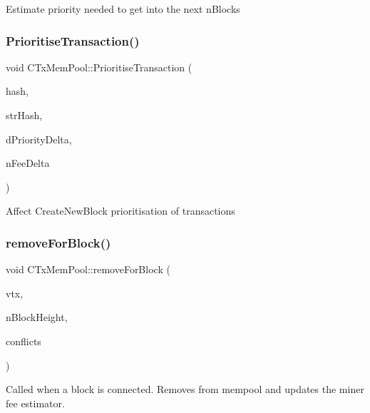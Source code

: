 Estimate priority needed to get into the next n\+Blocks \mbox{\label{class_c_tx_mem_pool_a1a0a00279c941051af1b74c5ebeac40d}} 
\subsubsection{\texorpdfstring{Prioritise\+Transaction()}{PrioritiseTransaction()}}
{\footnotesize\ttfamily void C\+Tx\+Mem\+Pool\+::\+Prioritise\+Transaction (\begin{DoxyParamCaption}\item[{const \mbox{\hyperlink{classuint256}{uint256}}}]{hash,  }\item[{const std\+::string}]{str\+Hash,  }\item[{double}]{d\+Priority\+Delta,  }\item[{const C\+Amount \&}]{n\+Fee\+Delta }\end{DoxyParamCaption})}

Affect Create\+New\+Block prioritisation of transactions \mbox{\label{class_c_tx_mem_pool_ac97207311007676bd7ef056a625e0e0a}} 
\subsubsection{\texorpdfstring{remove\+For\+Block()}{removeForBlock()}}
{\footnotesize\ttfamily void C\+Tx\+Mem\+Pool\+::remove\+For\+Block (\begin{DoxyParamCaption}\item[{const std\+::vector$<$ \mbox{\hyperlink{class_c_transaction}{C\+Transaction}} $>$ \&}]{vtx,  }\item[{unsigned int}]{n\+Block\+Height,  }\item[{std\+::list$<$ \mbox{\hyperlink{class_c_transaction}{C\+Transaction}} $>$ \&}]{conflicts }\end{DoxyParamCaption})}

Called when a block is connected. Removes from mempool and updates the miner fee estimator. \mbox{\label{class_c_tx_mem_pool_a251f595b6527be005634574ce5d01f70}} 
